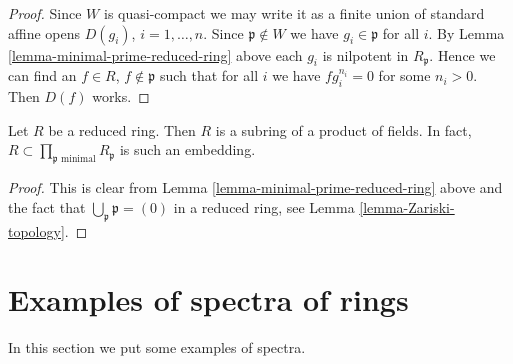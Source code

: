 \begin{proof}
Since $W$ is quasi-compact we may write it as a finite union
of standard affine opens $D(g_i)$, $i = 1, \ldots, n$.
Since $\mathfrak p \not \in W$ we have $g_i \in \mathfrak p$ for
all $i$. By Lemma \ref{lemma-minimal-prime-reduced-ring} above
each $g_i$ is nilpotent in $R_{\mathfrak p}$. Hence we can find
an $f \in R$, $f \not \in \mathfrak p$ such that for all $i$ we have
$f g_i^{n_i} = 0$ for some $n_i > 0$. Then $D(f)$ works.
\end{proof}

\begin{lemma}
\label{lemma-reduced-ring-sub-product-fields}
Let $R$ be a reduced ring.
Then $R$ is a subring of a product of fields.
In fact, $R \subset \prod_{\mathfrak p\text{ minimal}} R_{\mathfrak p}$
is such an embedding.
\end{lemma}

\begin{proof}
This is clear from Lemma \ref{lemma-minimal-prime-reduced-ring} above
and the fact that $\bigcup_{\mathfrak p} \mathfrak p = (0)$
in a reduced ring, see Lemma \ref{lemma-Zariski-topology}.
\end{proof}














\section{Examples of spectra of rings}
\label{section-examples-spectra}

\noindent
In this section we put some examples of spectra.

